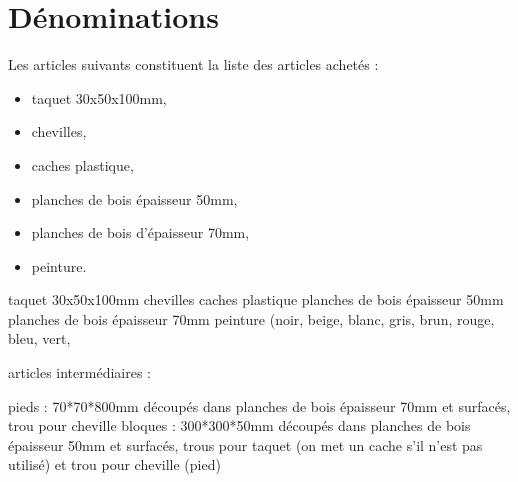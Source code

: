 \section{Dénominations}

Les articles suivants constituent la liste des articles achetés :

\begin{itemize}
	\item taquet 30x50x100mm,
	\item chevilles,
	\item caches plastique,
	\item planches de bois épaisseur 50mm,
	\item planches de bois d'épaisseur 70mm,
	\item peinture.
\end{itemize}


taquet 30x50x100mm 
chevilles
caches plastique
planches de bois épaisseur 50mm 
planches de bois épaisseur 70mm 
peinture (noir, beige, blanc, gris, brun, rouge, bleu, vert, 

articles intermédiaires : 

pieds : 70*70*800mm découpés dans planches de bois épaisseur 70mm et surfacés, trou pour cheville 
bloques : 300*300*50mm découpés dans planches de bois épaisseur 50mm et surfacés, trous pour taquet (on met un cache s'il n'est pas utilisé) et trou pour cheville (pied) 
